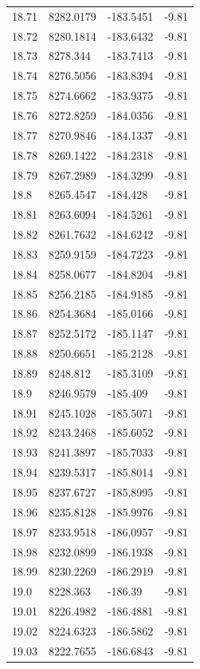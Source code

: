 \begin{table}[H]
\begin{tabular}{llll}
18.71 & 8282.0179 & -183.5451 & -9.81 \\
18.72 & 8280.1814 & -183.6432 & -9.81 \\
18.73 & 8278.344 & -183.7413 & -9.81 \\
18.74 & 8276.5056 & -183.8394 & -9.81 \\
18.75 & 8274.6662 & -183.9375 & -9.81 \\
18.76 & 8272.8259 & -184.0356 & -9.81 \\
18.77 & 8270.9846 & -184.1337 & -9.81 \\
18.78 & 8269.1422 & -184.2318 & -9.81 \\
18.79 & 8267.2989 & -184.3299 & -9.81 \\
18.8 & 8265.4547 & -184.428 & -9.81 \\
18.81 & 8263.6094 & -184.5261 & -9.81 \\
18.82 & 8261.7632 & -184.6242 & -9.81 \\
18.83 & 8259.9159 & -184.7223 & -9.81 \\
18.84 & 8258.0677 & -184.8204 & -9.81 \\
18.85 & 8256.2185 & -184.9185 & -9.81 \\
18.86 & 8254.3684 & -185.0166 & -9.81 \\
18.87 & 8252.5172 & -185.1147 & -9.81 \\
18.88 & 8250.6651 & -185.2128 & -9.81 \\
18.89 & 8248.812 & -185.3109 & -9.81 \\
18.9 & 8246.9579 & -185.409 & -9.81 \\
18.91 & 8245.1028 & -185.5071 & -9.81 \\
18.92 & 8243.2468 & -185.6052 & -9.81 \\
18.93 & 8241.3897 & -185.7033 & -9.81 \\
18.94 & 8239.5317 & -185.8014 & -9.81 \\
18.95 & 8237.6727 & -185.8995 & -9.81 \\
18.96 & 8235.8128 & -185.9976 & -9.81 \\
18.97 & 8233.9518 & -186.0957 & -9.81 \\
18.98 & 8232.0899 & -186.1938 & -9.81 \\
18.99 & 8230.2269 & -186.2919 & -9.81 \\
19.0 & 8228.363 & -186.39 & -9.81 \\
19.01 & 8226.4982 & -186.4881 & -9.81 \\
19.02 & 8224.6323 & -186.5862 & -9.81 \\
19.03 & 8222.7655 & -186.6843 & -9.81 \\

\end{tabular}
\end{table}
